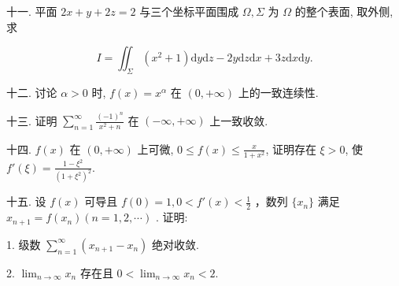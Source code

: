 \documentclass{examcollection}
\renewcommand{\displayformula}[1]{\[#1\]}
\begin{document}
{\begin{minipage}{\textwidth}
十一. 平面 $2x + y + 2z = 2$ 与三个坐标平面围成 $\Omega, \Sigma$ 为 $\Omega$ 的整个表面, 取外侧, 求\par
\displayformula{I = \iint_ {\Sigma} (x ^ {2} + 1) \mathrm{d} y \mathrm{d} z - 2 y \mathrm{d} z \mathrm{d} x + 3 z \mathrm{d} x \mathrm{d} y.}\par
十二. 讨论 $\alpha > 0$ 时, $f(x) = x^{\alpha}$ 在 $(0, +\infty)$ 上的一致连续性.\par
十三. 证明 $\sum_{n=1}^{\infty} \frac{(-1)^n}{x^2 + n}$ 在 $(- \infty, +\infty)$ 上一致收敛.\par
十四. $f(x)$ 在 $(0, +\infty)$ 上可微, $0 \leq f(x) \leq \frac{x}{1 + x^2}$, 证明存在 $\xi > 0$, 使 $f'(\xi) = \frac{1 - \xi^2}{(1 + \xi^2)^2}$.\par
十五. 设  $f(x)$  可导且  $f(0)=1, 0 < f'(x) < \frac{1}{2}$ ，数列  $\{x_{n}\}$  满足  $x_{n+1}=f(x_{n}) (n=1,2,\cdots)$ . 证明:\par
1. 级数 $\sum_{n=1}^{\infty}(x_{n+1} - x_n)$ 绝对收敛.\par
2. $\lim_{n\to \infty}x_n$ 存在且 $0 < \lim_{n\to \infty}x_n < 2.$\par
\end{minipage}}
\ifdim\dimexpr\ht\proofbox+\dp\proofbox\relax>\textheight
\noindent\resizebox{!}{\textheight}{\usebox{\proofbox}}\else\noindent\usebox{\proofbox}\fi\clearpage
\end{document}
